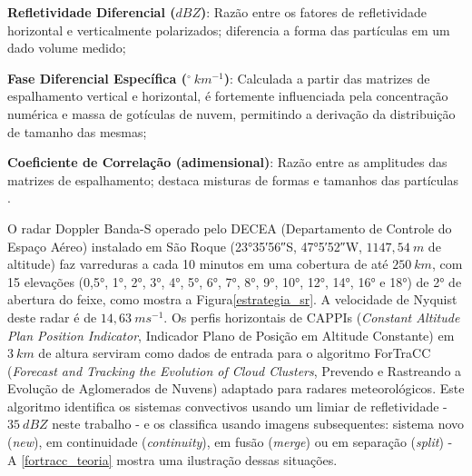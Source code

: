 \begin{alineas}
	\item \textbf{Refletividade Diferencial ($dBZ$)}: Razão entre os fatores de refletividade horizontal e verticalmente polarizados; diferencia a forma das partículas em um dado volume medido;
	\item \textbf{Fase Diferencial Específica ($^\circ\:km^{-1}$)}: Calculada a partir das matrizes de espalhamento vertical e horizontal, é fortemente influenciada pela concentração numérica e massa de gotículas de nuvem, permitindo a derivação da distribuição de tamanho das mesmas;
	\item \textbf{Coeficiente de Correlação (adimensional)}: Razão entre as amplitudes das matrizes de espalhamento; destaca misturas de formas e tamanhos das partículas \cite{Rauber2018}.
\end{alineas}

O radar Doppler Banda-S operado pelo DECEA (Departamento de Controle do Espaço Aéreo) instalado em São Roque (\ang{23;35;56}\:S, \ang{47;5;52}\:W, $1147,54\:m$ de altitude) faz varreduras a cada 10 minutos em uma cobertura de até $250\:km$, com 15 elevações (\ang{0,5}, \ang{1}, \ang{2}, \ang{3}, \ang{4}, \ang{5}, \ang{6}, \ang{7}, \ang{8}, \ang{9}, \ang{10}, \ang{12}, \ang{14}, \ang{16} e \ang{18}) de \ang{2} de abertura do feixe, como mostra a Figura\autoref{estrategia_sr}. A velocidade de Nyquist deste radar é de $14,63\:ms^{-1}$. Os perfis horizontais de CAPPIs (\textit{Constant Altitude Plan Position Indicator}, Indicador Plano de Posição em Altitude Constante) em $3\:km$ de altura serviram como dados de entrada para o algoritmo ForTraCC (\textit{Forecast and Tracking the Evolution of Cloud Clusters}, Prevendo e Rastreando a Evolução de Aglomerados de Nuvens) \cite{Vila2008} adaptado para radares meteorológicos. Este algoritmo identifica os sistemas convectivos usando um limiar de refletividade - $35\:dBZ$ neste trabalho - e os classifica usando imagens subsequentes: sistema novo (\textit{new}), em continuidade (\textit{continuity}), em fusão (\textit{merge}) ou em separação (\textit{split}) - A \autoref{fortracc_teoria} mostra uma ilustração dessas situações.

